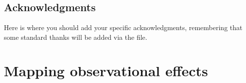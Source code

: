 \documentclass[\docopts]{\docclass}
\begin{document}
\subsection*{Acknowledgments}

Here is where you should add your specific acknowledgments, remembering that some standard thanks will be added via the  file.






\appendix
\section{Mapping observational effects}
\label{sec:systematic_maps}
\end{document}
